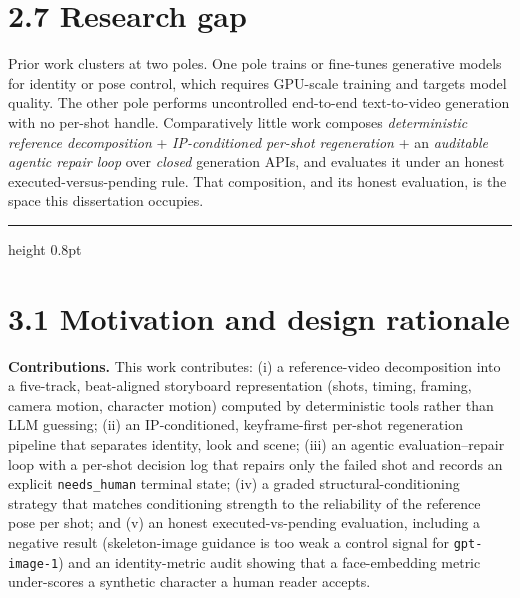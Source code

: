 \documentclass[10pt,twocolumn,letterpaper]{article}
\begin{document}

\section*{2.7 Research gap}

Prior work clusters at two poles. One pole trains or fine-tunes generative models for identity or pose control, which requires GPU-scale training and targets model quality. The other pole performs uncontrolled end-to-end text-to-video generation with no per-shot handle. Comparatively little work composes \emph{deterministic reference decomposition} + \emph{IP-conditioned per-shot regeneration} + an \emph{auditable agentic repair loop} over \emph{closed} generation APIs, and evaluates it under an honest executed-versus-pending rule. That composition, and its honest evaluation, is the space this dissertation occupies.

\par\vspace{22pt}

\vspace*{2pt}\vspace{3pt}\hrule height 0.8pt\vspace{12pt}


\section*{3.1 Motivation and design rationale}

\textbf{Contributions.} This work contributes: (i) a reference-video decomposition into a five-track, beat-aligned storyboard representation (shots, timing, framing, camera motion, character motion) computed by deterministic tools rather than LLM guessing; (ii) an IP-conditioned, keyframe-first per-shot regeneration pipeline that separates identity, look and scene; (iii) an agentic evaluation--repair loop with a per-shot decision log that repairs only the failed shot and records an explicit \texttt{needs\_human} terminal state; (iv) a graded structural-conditioning strategy that matches conditioning strength to the reliability of the reference pose per shot; and (v) an honest executed-vs-pending evaluation, including a negative result (skeleton-image guidance is too weak a control signal for \texttt{gpt-image-1}) and an identity-metric audit showing that a face-embedding metric under-scores a synthetic character a human reader accepts.
\end{document}
